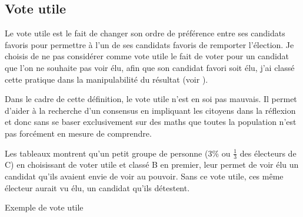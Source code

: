 \documentclass[../report]{subfiles}
\begin{document}
  \subsection{Vote utile}%
  \label{diff:comp:util:util}

  Le vote utile est le fait de changer son ordre de préférence entre ses candidats favoris pour
  permettre à l'un de ses candidats favoris de remporter l'élection. 
  Je choisis de ne pas considérer comme vote utile le fait de voter pour un candidat que l'on ne
  souhaite pas voir élu, afin que son candidat favori soit élu, j'ai classé cette pratique 
  dans la manipulabilité du résultat (voir ).

  Dans le cadre de cette définition, le vote utile n'est en soi pas mauvais.
  Il permet d'aider à la recherche d'un consensus en impliquant les citoyens dans la réflexion
  et donc sans se baser exclusivement sur des maths que toutes la population n'est pas forcément
  en mesure de comprendre.
  
  Les tableaux  montrent qu'un petit groupe de personne (3\% ou $\frac{1}{3}$ des 
  électeurs de C) en choisissant de voter utile et classé B en premier, leur permet de voir élu un candidat qu'ils
  avaient envie de voir au pouvoir.
  Sans ce vote utile, ces même électeur aurait vu élu, un candidat qu'ils détestent.

  \begin{table}[h]
	\begin{center}
		\caption{Exemple de vote utile}%
		\label{fig:critere:utile:example}
		\\[1em]
	\end{center}
  \end{table}
\end{document}
